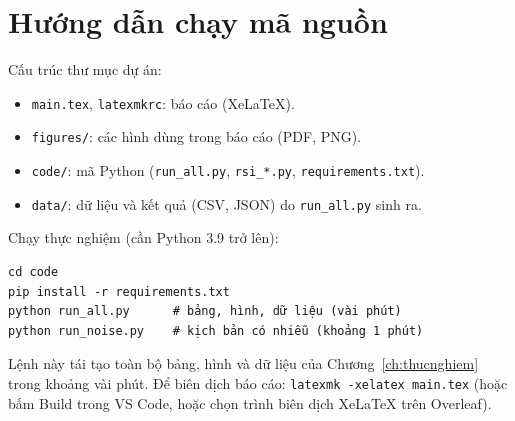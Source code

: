 \documentclass[12pt,a4paper,openany]{report}
\numberwithin{equation}{chapter}   %
\theoremstyle{definition}
\newcommand{\code}[1]{\texttt{#1}}
\begin{document}
\chapter{Hướng dẫn chạy mã nguồn}\label{app:ma}
Cấu trúc thư mục dự án:
\begin{itemize}
  \item \code{main.tex}, \code{latexmkrc}: báo cáo (XeLaTeX).
  \item \code{figures/}: các hình dùng trong báo cáo (PDF, PNG).
  \item \code{code/}: mã Python (\code{run\_all.py}, \code{rsi\_*.py}, \code{requirements.txt}).
  \item \code{data/}: dữ liệu và kết quả (CSV, JSON) do \code{run\_all.py} sinh ra.
\end{itemize}
Chạy thực nghiệm (cần Python 3.9 trở lên):
\begin{verbatim}
cd code
pip install -r requirements.txt
python run_all.py      # bảng, hình, dữ liệu (vài phút)
python run_noise.py    # kịch bản có nhiễu (khoảng 1 phút)
\end{verbatim}
Lệnh này tái tạo toàn bộ bảng, hình và dữ liệu của Chương~\ref{ch:thucnghiem} trong khoảng vài phút. Để biên dịch báo cáo: \code{latexmk -xelatex main.tex} (hoặc bấm Build trong VS Code, hoặc chọn trình biên dịch XeLaTeX trên Overleaf).
\end{document}

